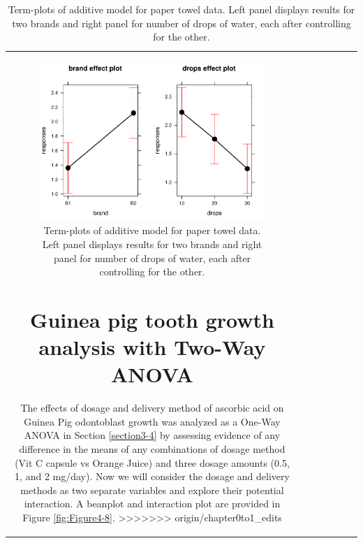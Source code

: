 \documentclass[]{book}
\newenvironment{Shaded}{\begin{snugshade}}{\end{snugshade}}
\theoremstyle{definition}
\theoremstyle{definition}
\theoremstyle{remark}
\begin{document}
\begin{longtable}[]{@{}ccccccc@{}}
\begin{minipage}[b]{0.10\columnwidth}
\begin{Shaded}
\begin{Highlighting}[]
\begin{Shaded}
\begin{Highlighting}[]
\begin{figure}
\centering
\includegraphics{04-twoWayAnova_files/figure-latex/Figure4-7-1.pdf}
\caption{\label{fig:Figure4-7}Term-plots of additive model for paper towel data. Left
panel displays results for two brands and right panel for number of
drops of water, each after controlling for the other.}
\end{figure}

\newpage

\section{Guinea pig tooth growth analysis with Two-Way
ANOVA}\label{section4-4}

The effects of dosage and delivery method of ascorbic acid on Guinea Pig
odontoblast growth was analyzed as a One-Way ANOVA in Section
\ref{section3-4} by assessing evidence of any difference in the means of
any combinations of dosage method (Vit C capsule vs Orange Juice) and
three dosage amounts (0.5, 1, and 2 mg/day). Now we will consider the
dosage and delivery methods as two separate variables and explore their
potential interaction. A beanplot and interaction plot are provided in
Figure \ref{fig:Figure4-8}.
>>>>>>> origin/chapter0to1_edits




\end{Highlighting}
\end{Shaded}
\end{Highlighting}
\end{Shaded}
\end{minipage}
\end{longtable}
\end{document}
